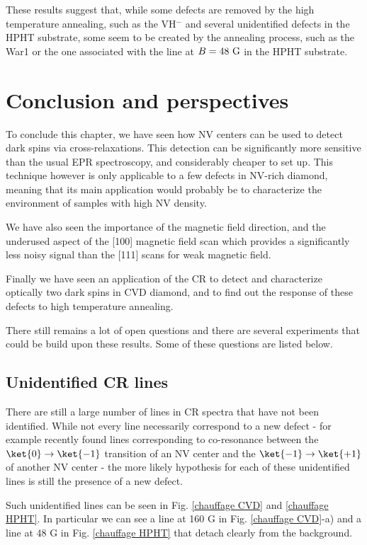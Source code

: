 \documentclass[a4paper,11pt]{report}
\begin{document}
These results suggest that, while some defects are removed by the high temperature annealing, such as the VH$^-$ and several unidentified defects in the HPHT substrate, some seem to be created by the annealing process, such as the War1 or the one associated with the line at $B = 48\ \rm G$ in the HPHT substrate.

\section{Conclusion and perspectives}

To conclude this chapter, we have seen how NV centers can be used to detect dark spins via cross-relaxations. This detection can be significantly more sensitive than the usual EPR spectroscopy, and considerably cheaper to set up. This technique however is only applicable to a few defects in NV-rich diamond, meaning that its main application would probably be to characterize the environment of samples with high NV density.

We have also seen the importance of the magnetic field direction, and the underused aspect of the [100] magnetic field scan which provides a significantly less noisy signal than the [111] scans for weak magnetic field.

Finally we have seen an application of the CR to detect and characterize optically two dark spins in CVD diamond, and to find out the response of these defects to high temperature annealing.

There still remains a lot of open questions and there are several experiments that could be build upon these results. Some of these questions are listed below.

\subsection{Unidentified CR lines}

There are still a large number of lines in CR spectra that have not been identified. While not every line necessarily correspond to a new defect - for example \citep{wunderlich2021magnetic} recently found lines corresponding to co-resonance between the $\ket{0} \to \ket{-1}$ transition of an NV center and the $\ket{-1} \to \ket{+1}$ of another NV center - the more likely hypothesis for each of these unidentified lines is still the presence of a new defect.

Such unidentified lines can be seen in Fig. \ref{chauffage CVD} and \ref{chauffage HPHT}. In particular we can see a line at 160 G in Fig. \ref{chauffage CVD}-a) and a line at 48 G in Fig. \ref{chauffage HPHT} that detach clearly from the background. 
\end{document}
